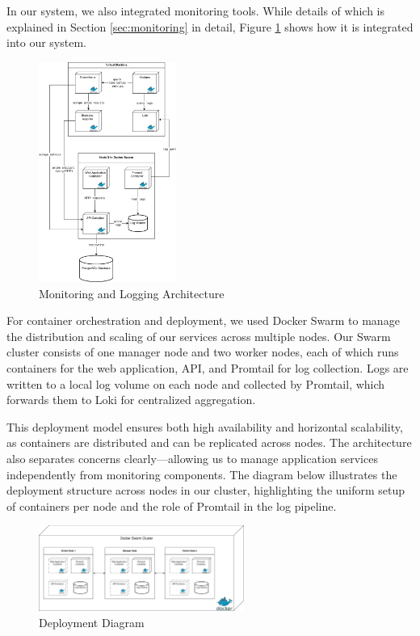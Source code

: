 In our system, we also integrated monitoring tools. While details of which is explained in Section \ref{sec:monitoring} in detail, Figure \ref{fig:monitoring-arch} shows how it is integrated into our system. 

\begin{figure}[H]
  \centering
  \includegraphics[width=0.4\textwidth]{images/monitoring-arch.png}
  \caption{Monitoring and Logging Architecture}
  \label{fig:monitoring-arch}
\end{figure}

For container orchestration and deployment, we used Docker Swarm to manage the distribution and scaling of our services across multiple nodes. Our Swarm cluster consists of one manager node and two worker nodes, each of which runs containers for the web application, API, and Promtail for log collection. Logs are written to a local log volume on each node and collected by Promtail, which forwards them to Loki for centralized aggregation.

This deployment model ensures both high availability and horizontal scalability, as containers are distributed and can be replicated across nodes. The architecture also separates concerns clearly—allowing us to manage application services independently from monitoring components. The diagram below illustrates the deployment structure across nodes in our cluster, highlighting the uniform setup of containers per node and the role of Promtail in the log pipeline.

\begin{figure}[H]
  \centering
  \includegraphics[width=0.6\textwidth]{images/docker-swarm.png}
  \caption{Deployment Diagram}
  \label{fig:docker-swarm}
\end{figure}


